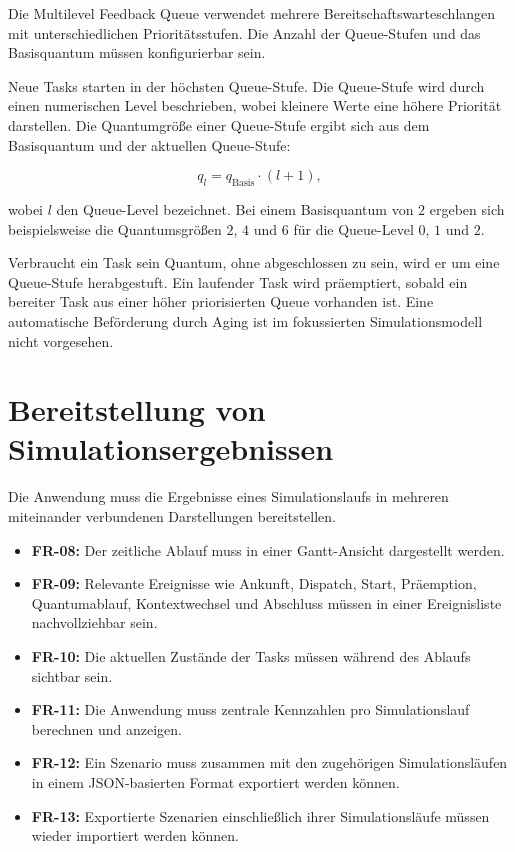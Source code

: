 Die Multilevel Feedback Queue verwendet mehrere Bereitschaftswarteschlangen mit unterschiedlichen Prioritätsstufen. Die Anzahl der Queue-Stufen und das Basisquantum müssen konfigurierbar sein.

Neue Tasks starten in der höchsten Queue-Stufe. Die Queue-Stufe wird durch einen numerischen Level beschrieben, wobei kleinere Werte eine höhere Priorität darstellen. Die Quantumgröße einer Queue-Stufe ergibt sich aus dem Basisquantum und der aktuellen Queue-Stufe:

\begin{equation}
q_l = q_{\mathrm{Basis}} \cdot (l+1),
\end{equation}

wobei $l$ den Queue-Level bezeichnet. Bei einem Basisquantum von $2$ ergeben sich beispielsweise die Quantumsgrößen $2$, $4$ und $6$ für die Queue-Level $0$, $1$ und $2$.

Verbraucht ein Task sein Quantum, ohne abgeschlossen zu sein, wird er um eine Queue-Stufe herabgestuft. Ein laufender Task wird präemptiert, sobald ein bereiter Task aus einer höher priorisierten Queue vorhanden ist. Eine automatische Beförderung durch Aging ist im fokussierten Simulationsmodell nicht vorgesehen.

\section{Bereitstellung von Simulationsergebnissen}

Die Anwendung muss die Ergebnisse eines Simulationslaufs in mehreren miteinander verbundenen Darstellungen bereitstellen.

\begin{itemize}
    \item \textbf{FR-08:} Der zeitliche Ablauf muss in einer Gantt-Ansicht dargestellt werden.
    \item \textbf{FR-09:} Relevante Ereignisse wie Ankunft, Dispatch, Start, Präemption, Quantumablauf, Kontextwechsel und Abschluss müssen in einer Ereignisliste nachvollziehbar sein.
    \item \textbf{FR-10:} Die aktuellen Zustände der Tasks müssen während des Ablaufs sichtbar sein.
    \item \textbf{FR-11:} Die Anwendung muss zentrale Kennzahlen pro Simulationslauf berechnen und anzeigen.
    \item \textbf{FR-12:} Ein Szenario muss zusammen mit den zugehörigen Simulationsläufen in einem JSON-basierten Format exportiert werden können.
    \item \textbf{FR-13:} Exportierte Szenarien einschließlich ihrer Simulationsläufe müssen wieder importiert werden können.
\end{itemize}

